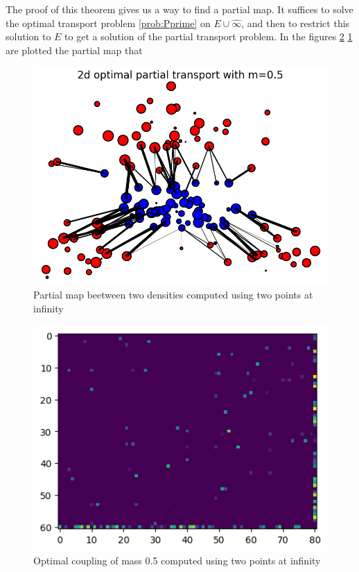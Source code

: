 \documentclass[a4paper,11pt]{article}
\theoremstyle{definition}
\begin{document}
The proof of this theorem gives us a way to find a partial map. It suffices to solve the optimal transport problem \ref{prob:Pprime} on $E\cup{\hat \infty}$, and then to restrict this solution to $E$ to get a solution of the partial transport problem. In the figures \ref{fig:coupling} \ref{fig:partialmap} are plotted the partial map that \\

\begin{figure}
        \centering
        \includegraphics[width=0.8\linewidth]{image/partialmap2}
        \caption{Partial map beetween two densities computed using two points at infinity}
        \label{fig:partialmap}
    \end{figure}
    \begin{figure}
        \centering
        \includegraphics[width=0.8\linewidth]{image/Optimal coupling of mass 0.5 computed using two points at infinity.png}
        \caption{Optimal coupling of mass 0.5 computed using two points at infinity}
        \label{fig:coupling}
    \end{figure}
\end{document}
